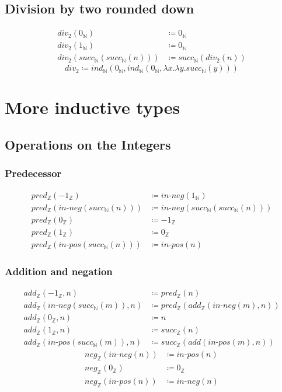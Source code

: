 \documentclass{article}
\begin{document}
\subsection{Division by two rounded down}
\begin{align}
    div_2(0_{\mathbb{N}}) &\coloneqq 0_{\mathbb{N}} \\
    div_2(1_{\mathbb{N}}) &\coloneqq 0_{\mathbb{N}} \\
    div_2(succ_{\mathbb{N}}(succ_{\mathbb{N}}(n))) &\coloneqq succ_{\mathbb{N}}(div_2(n))
\end{align}
$$
    div_2 \coloneqq ind_{\mathbb{N}}(0_{\mathbb{N}},ind_{\mathbb{N}}(0_{\mathbb{N}}, \lambda x.\lambda y. succ_{\mathbb{N}}(y)))
$$
\section{More inductive types}
\subsection{Operations on the Integers}
\subsubsection{Predecessor}
\begin{align}
    pred_{\mathbb{Z}}(-1_{\mathbb{Z}}) &\coloneqq in\text{-}neg(1_{\mathbb{N}}) \\
    pred_{\mathbb{Z}}(in\text{-}neg(succ_{\mathbb{N}}(n))) &\coloneqq in\text{-}neg(succ_{\mathbb{N}}(succ_{\mathbb{N}}(n))) \\
    pred_{\mathbb{Z}}(0_{\mathbb{Z}}) &\coloneqq -1_{\mathbb{Z}} \\
    pred_{\mathbb{Z}}(1_{\mathbb{Z}}) &\coloneqq 0_{\mathbb{Z}} \\
    pred_{\mathbb{Z}}(in\text{-}pos(succ_{\mathbb{N}}(n))) &\coloneqq in\text{-}pos(n)
\end{align}
\subsubsection{Addition and negation}
\begin{align}
    add_{\mathbb{Z}}(-1_{\mathbb{Z}},n) &\coloneqq pred_{\mathbb{Z}}(n) \\
    add_{\mathbb{Z}}(in\text{-}neg(succ_{\mathbb{N}}(m)),n) &\coloneqq pred_{\mathbb{Z}}(add_{\mathbb{Z}}(in\text{-}neg(m),n)) \\
    add_{\mathbb{Z}}(0_{\mathbb{Z}},n) &\coloneqq n \\
    add_{\mathbb{Z}}(1_{\mathbb{Z}},n) &\coloneqq succ_{\mathbb{Z}}(n) \\
    add_{\mathbb{Z}}(in\text{-}pos(succ_{\mathbb{N}}(m)),n) &\coloneqq succ_{\mathbb{Z}}(add(in\text{-}pos(m),n))
\end{align}
\begin{align}
    neg_{\mathbb{Z}}(in\text{-}neg(n)) &\coloneqq in\text{-}pos(n) \\
    neg_{\mathbb{Z}}(0_{\mathbb{Z}}) &\coloneqq 0_{\mathbb{Z}} \\
    neg_{\mathbb{Z}}(in\text{-}pos(n)) &\coloneqq in\text{-}neg(n)
\end{align}
\end{document}
